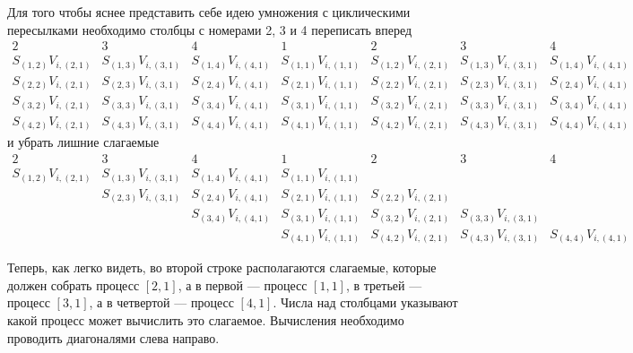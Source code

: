 Для того чтобы яснее представить себе идею умножения с циклическими пересылками необходимо столбцы с номерами 2, 3 и 4 переписать вперед
$$
	\begin{array}{ccccccc}
		2                     & 3                     & 4                     & 1                     & 2                     & 3                     & 4 \\
		S_{(1,2)} V_{i,(2,1)} & S_{(1,3)} V_{i,(3,1)} & S_{(1,4)} V_{i,(4,1)} & S_{(1,1)} V_{i,(1,1)} & S_{(1,2)} V_{i,(2,1)} & S_{(1,3)} V_{i,(3,1)} & S_{(1,4)} V_{i,(4,1)} \\
		S_{(2,2)} V_{i,(2,1)} & S_{(2,3)} V_{i,(3,1)} & S_{(2,4)} V_{i,(4,1)} & S_{(2,1)} V_{i,(1,1)} & S_{(2,2)} V_{i,(2,1)} & S_{(2,3)} V_{i,(3,1)} & S_{(2,4)} V_{i,(4,1)} \\
		S_{(3,2)} V_{i,(2,1)} & S_{(3,3)} V_{i,(3,1)} & S_{(3,4)} V_{i,(4,1)} & S_{(3,1)} V_{i,(1,1)} & S_{(3,2)} V_{i,(2,1)} & S_{(3,3)} V_{i,(3,1)} & S_{(3,4)} V_{i,(4,1)} \\
		S_{(4,2)} V_{i,(2,1)} & S_{(4,3)} V_{i,(3,1)} & S_{(4,4)} V_{i,(4,1)} & S_{(4,1)} V_{i,(1,1)} & S_{(4,2)} V_{i,(2,1)} & S_{(4,3)} V_{i,(3,1)} & S_{(4,4)} V_{i,(4,1)}
	\end{array}
$$
и убрать лишние слагаемые
$$
	\begin{array}{ccccccc}
		2                     & 3                     & 4                     & 1                     & 2                     & 3                     & 4 \\
		S_{(1,2)} V_{i,(2,1)} & S_{(1,3)} V_{i,(3,1)} & S_{(1,4)} V_{i,(4,1)} & S_{(1,1)} V_{i,(1,1)} &                       &                       & \\
		                      & S_{(2,3)} V_{i,(3,1)} & S_{(2,4)} V_{i,(4,1)} & S_{(2,1)} V_{i,(1,1)} & S_{(2,2)} V_{i,(2,1)} &                       & \\
		                      &                       & S_{(3,4)} V_{i,(4,1)} & S_{(3,1)} V_{i,(1,1)} & S_{(3,2)} V_{i,(2,1)} & S_{(3,3)} V_{i,(3,1)} & \\
		                      &                       &                       & S_{(4,1)} V_{i,(1,1)} & S_{(4,2)} V_{i,(2,1)} & S_{(4,3)} V_{i,(3,1)} & S_{(4,4)} V_{i,(4,1)}
	\end{array}
$$

Теперь, как легко видеть, во второй строке располагаются слагаемые, которые должен собрать процесс $[2,1]$, а в первой --- процесс $[1,1]$, в третьей --- процесс $[3,1]$,
а в четвертой --- процесс $[4,1]$. Числа над столбцами указывают какой процесс может вычислить это слагаемое. Вычисления необходимо проводить диагоналями слева направо.

